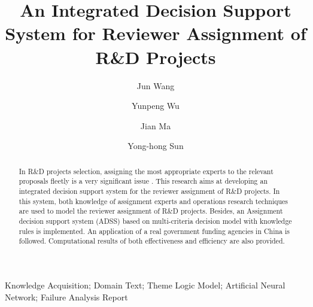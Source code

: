 \documentclass{elsarticle}
\begin{document}
\begin{frontmatter}


\title{An Integrated Decision Support System for 
Reviewer Assignment of R\&D Projects}


\author[buaa]{Jun Wang}
\author[buaa]{Yunpeng Wu}
\author[hk]{Jian Ma}
\author[hk]{Yong-hong Sun}





\address[buaa]{School of Economics \& Management, Beihang University, Beijing 100083,
P.R. China }
\address[hk]{Department of Information Systems, City University of Hong Kong Kowloon, Hong Kong}


\begin{abstract}
In R\&D projects selection, assigning the most appropriate
experts to the relevant proposals fleetly is a very significant issue . This research aims at
developing an integrated decision support system for the reviewer assignment of R\&D projects. In this system, both knowledge of assignment experts and operations research techniques are used to
model the reviewer assignment of R\&D projects. Besides, an Assignment decision support system (ADSS) based on multi-criteria decision model
with knowledge rules is implemented. An application of a real government funding agencies in China is followed. Computational results of both effectiveness and efficiency are also provided. 
\end{abstract}

\begin{keyword}


Knowledge Acquisition; Domain Text; Theme Logic Model; Artificial Neural Network; Failure Analysis Report


\end{keyword}

\end{frontmatter}
\end{document}
